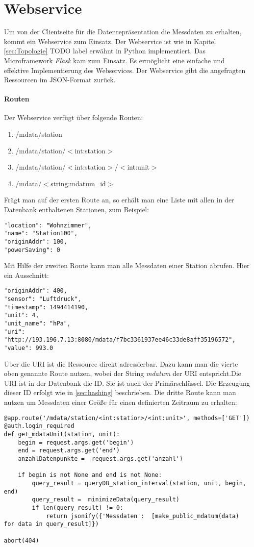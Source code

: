 \section{Webservice}
\label{sec:webservice}
Um von der Clientseite für die Datenrepräsentation die Messdaten zu erhalten, kommt ein Webservice zum Einsatz. Der Webservice ist wie in Kapitel \ref{sec:Topologie} TODO label erwähnt in Python implementiert. Das Microframework \textit{Flask} kam zum Einsatz. Es ermöglicht eine einfache und effektive Implementierung des Webservices. Der Webservice gibt die angefragten Ressourcen im JSON-Format zurück. 

\paragraph{Routen}
Der Webservice verfügt über folgende Routen: 
\begin{enumerate}
\item /mdata/station
\item /mdata/station/$<$int:station$>$
\item /mdata/station/$<$int:station$>$/$<$int:unit$>$
\item /mdata/$<$string:mdatum\_id$>$
\end{enumerate} 
Frägt man auf der ersten Route an, so erhält man eine Liste mit allen in der Datenbank enthaltenen Stationen, zum Beispiel:
\lstset{language=c, numbers=none, breaklines=true}
\begin{lstlisting}
"location": "Wohnzimmer", 
"name": "Station100", 
"originAddr": 100, 
"powerSaving": 0
\end{lstlisting}
Mit Hilfe der zweiten Route kann man alle Messdaten einer Station abrufen. Hier ein Ausschnitt:
\lstset{language=c, numbers=none, breaklines=true}
\begin{lstlisting}
"originAddr": 400, 
"sensor": "Luftdruck", 
"timestamp": 1494414190, 
"unit": 4, 
"unit_name": "hPa", 
"uri": "http://193.196.7.13:8080/mdata/f7bc3361937ee46c33de8aff35196572", 
"value": 993.0
\end{lstlisting}
Über die URI ist die Ressource direkt adressierbar. Dazu kann man die vierte oben genannte Route nutzen, wobei der String \textit{mdatum} der URI entspricht.Die URI ist in der Datenbank die ID. Sie ist auch der Primärschlüssel. Die Erzeugung dieser ID erfolgt wie in \ref{sec:hashing} beschrieben. 
Die dritte Route kann man nutzen um Messdaten einer Größe für einen definierten Zeitraum zu erhalten:
\lstset{language=python, numbers=left, breaklines=true}
\begin{lstlisting}
@app.route('/mdata/station/<int:station>/<int:unit>', methods=['GET'])
@auth.login_required
def get_mdataUnit(station, unit):
    begin = request.args.get('begin')
    end = request.args.get('end')
    anzahlDatenpunkte =  request.args.get('anzahl')

    if begin is not None and end is not None:
        query_result = queryDB_station_interval(station, unit, begin, end)
        query_result =  minimizeData(query_result)
        if len(query_result) != 0:
            return jsonify({'Messdaten':  [make_public_mdatum(data) for data in query_result]})

abort(404)
\end{lstlisting} 
